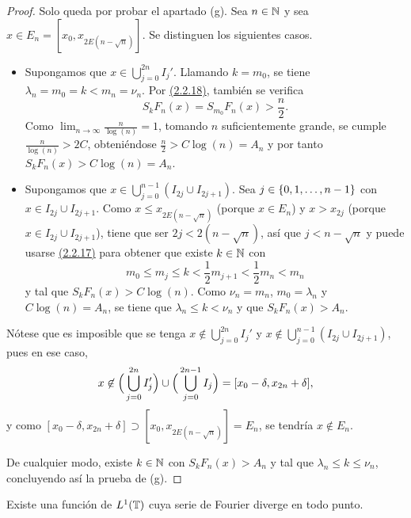 \documentclass[a4paper, 12pt, oneside]{book}
\begin{document}
\begin{proof}
    Solo queda por probar el apartado (g). Sea $n \in \mathbb N$ y sea $x \in E_n=[x_0,x_{2E(n-\sqrt{n})}]$. Se distinguen los siguientes casos.
    \begin{itemize}
        \item Supongamos que $x\in\bigcup_{j=0}^{2n}I_j'$. Llamando $k = m_0$, se tiene $\lambda_n = m_0 = k < m_n = \nu_n$. Por \hyperref[2.2.18]{\color{blue}(2.2.18)}, también se verifica 
        \[S_{k}F_n(x) = S_{m_0}F_n(x) > \frac{n}{2}.\]
        Como $\lim_{n\to\infty} \frac{n}{\log(n)} = 1$, tomando $n$ suficientemente grande, se cumple $\frac{n}{\log(n)} > 2C$, obteniéndose $\frac{n}{2} > C\log(n) = A_n$ y por tanto $S_kF_n(x) > C\log(n) = A_n$.
        \item Supongamos que $x \in \bigcup_{j=0}^{n-1}(I_{2j}\cup I_{2j+1})$. Sea $j \in \{0,1,\mathellipsis,n-1\}$ con $x \in I_{2j} \cup I_{2j+1}$. Como $x \leq x_{2E(n-\sqrt{n})}$ (porque $x \in E_n$) y $x > x_{2j}$ (porque $x \in I_{2j} \cup I_{2j+1}$), tiene que ser $2j < 2(n-\sqrt{n})$, así que $j < n-\sqrt{n}$ y puede usarse \hyperref[2.2.17]{\color{blue}(2.2.17)} para obtener que existe $k \in \mathbb N$ con 
        \[m_0 \leq m_j \leq k < \frac{1}{2}m_{j+1} < \frac{1}{2}m_n < m_n\]
        y tal que $S_{k}F_n(x) >  C\log(n)$. Como $\nu_n = m_n$, $m_0 = \lambda_n$ y $C\log(n) = A_n$, se tiene que $\lambda_n \leq k < \nu_n$ y que $S_{k}F_n(x) > A_n$.
    \end{itemize}
    Nótese que es imposible que se tenga $x\not\in \bigcup_{j=0}^{2n}I_j'$ y $x \not\in \bigcup_{j=0}^{n-1}(I_{2j}\cup I_{2j+1})$, pues en ese caso,
    \[x\not\in \Bigl(\,\bigcup_{j=0}^{2n}I_j'\Bigr) \cup\Bigl(\,\bigcup_{j=0}^{2n-1}I_j\Bigr) = [x_0-\delta,x_{2n}+\delta],\]
    y como $[x_0-\delta,x_{2n}+\delta] \supset [x_0,x_{2E(n-\sqrt{n})}] = E_n$, se tendría $x \not\in E_n$.

    De cualquier modo, existe $k \in \mathbb N$ con $S_kF_n(x) > A_n$ y tal que $\lambda_n \leq k \leq \nu_n$, concluyendo así la prueba de (g).
\end{proof}

\begin{theorem}
    Existe una función de $L^1(\mathbb T)$ cuya serie de Fourier diverge en todo punto.
\end{theorem}
\end{document}
